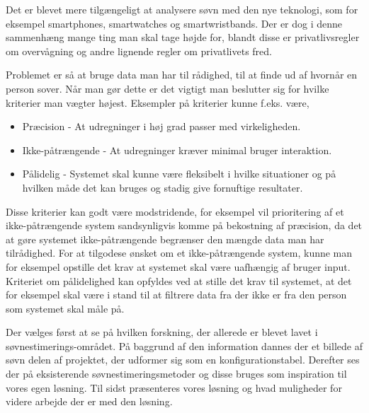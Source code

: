 Det er blevet mere tilgængeligt at analysere søvn med den nye teknologi, som for eksempel smartphones, smartwatches og smartwristbands.
Der er dog i denne sammenhæng mange ting man skal tage højde for, blandt disse er privatlivsregler om overvågning og andre lignende regler om privatlivets fred.

Problemet er så at bruge data man har til rådighed, til at finde ud af hvornår en person sover.
Når man gør dette er det vigtigt man beslutter sig for hvilke kriterier man vægter højest.
Eksempler på kriterier kunne f.eks. være,

\begin{itemize}
	\item Præcision - At udregninger i høj grad passer med virkeligheden.
	\item Ikke-påtrængende - At udregninger kræver minimal bruger interaktion.
	\item Pålidelig - Systemet skal kunne være fleksibelt i hvilke situationer og på hvilken måde det kan bruges og stadig give fornuftige resultater.
\end{itemize}


Disse kriterier kan godt være modstridende, for eksempel vil prioritering af et ikke-påtrængende system sandsynligvis komme på bekostning af præcision, da det at gøre systemet ikke-påtrængende begrænser den mængde data man har tilrådighed.
For at tilgodese ønsket om et ikke-påtrængende system, kunne man for eksempel opstille det krav at systemet skal være uafhængig af bruger input.
Kriteriet om pålidelighed kan opfyldes ved at stille det krav til systemet, at det for eksempel skal være i stand til at filtrere data fra der ikke er fra den person som systemet skal måle på.

Der vælges først at se på hvilken forskning, der allerede er blevet lavet i søvnestimerings-området.
På baggrund af den information dannes der et billede af søvn delen af projektet, der udformer sig som en konfigurationstabel.
Derefter ses der på eksisterende søvnestimeringsmetoder og disse bruges som inspiration til vores egen løsning.
Til sidst præsenteres vores løsning og hvad muligheder for videre arbejde der er med den løsning. 



